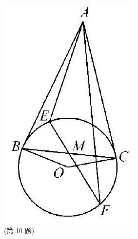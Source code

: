 \documentclass[10pt]{article}
\begin{document}
\includegraphics[max width=\textwidth, center]{2024_10_30_66b8e5e701da2093c133g-079(1)}\\
(第 10 题)
\end{document}
